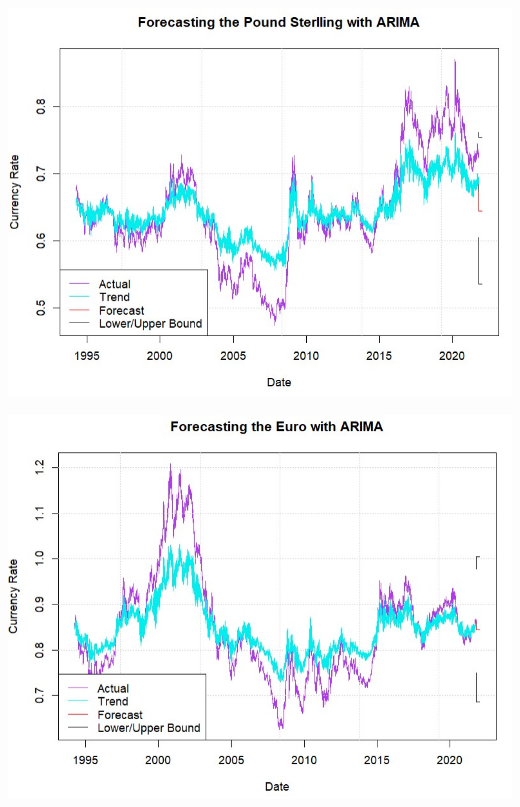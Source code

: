 \documentclass[11pt,preprint, authoryear]{elsarticle}
\let\origfigure\figure
\let\endorigfigure\endfigure
\renewenvironment{figure}[1][2] {
    \expandafter\origfigure\expandafter[H]
} {
    \endorigfigure
}
\numberwithin{equation}{section}
\numberwithin{figure}{section}
\numberwithin{table}{section}
\begin{document}
\begin{figure}
\centering 
\begin{minipage}[t]{8.2cm} 
\centering 
 \includegraphics[width=\linewidth]{fore1.jpg} 
 \end{minipage} 
 \hspace{0.1cm} 
 \begin{minipage}[t]{8.2cm} 
 \centering 
 \includegraphics[width=\linewidth]{fore2.jpg} 
 \end{minipage}
\caption{caption1}
\label{for1}
\end{figure}
\end{document}
